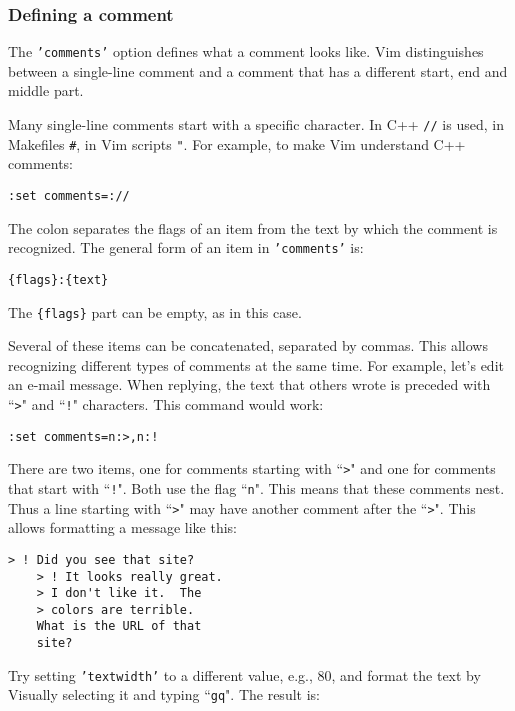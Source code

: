 \subsubsection{Defining a comment}
The \texttt{'comments'} option defines what a comment looks like.
Vim distinguishes between a single-line comment and a comment that has a different start, end and middle part.

Many single-line comments start with a specific character.
In C++ \texttt{//} is used, in Makefiles \texttt{\#}, in Vim scripts \texttt{"}.
For example, to make Vim understand C++ comments:

\begin{Verbatim}[samepage=true]
 :set comments=://
\end{Verbatim}

The colon separates the flags of an item from the text by which the comment is recognized.
The general form of an item in \texttt{'comments'} is:

\begin{Verbatim}[samepage=true]
    {flags}:{text}
\end{Verbatim}

The \texttt{\{flags\}} part can be empty, as in this case.

Several of these items can be concatenated, separated by commas.
This allows recognizing different types of comments at the same time.
For example, let's edit an e-mail message.
When replying, the text that others wrote is preceded with ``\texttt{>}" and ``\texttt{!}" characters.
This command would work:

\begin{Verbatim}[samepage=true]
 :set comments=n:>,n:!
\end{Verbatim}

There are two items, one for comments starting with ``\texttt{>}" and one for comments that start with ``\texttt{!}".
Both use the flag ``\texttt{n}".
This means that these comments nest.
Thus a line starting with ``\texttt{>}" may have another comment after the ``\texttt{>}".
This allows formatting a message like this:

\begin{Verbatim}[samepage=true]
    > ! Did you see that site? 
    > ! It looks really great. 
    > I don't like it.  The 
    > colors are terrible. 
    What is the URL of that 
    site? 
\end{Verbatim}

Try setting \texttt{'textwidth'} to a different value, e.g., 80, and format the text by Visually selecting it and typing ``\texttt{gq}".
The result is:

